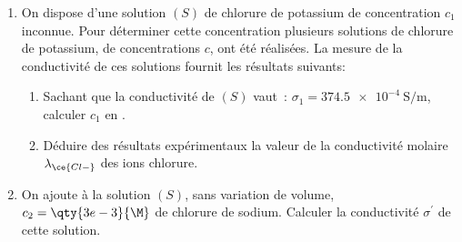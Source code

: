 \begin{enumerate}
    \item On dispose d'une solution $(S)$ de chlorure de potassium  de
          concentration $c_1$ inconnue. Pour déterminer cette concentration
          plusieurs solutions de chlorure de potassium, de concentrations $c$,
          ont été réalisées. La mesure de la conductivité de ces solutions
          fournit les résultats suivants:

          \begin{figure}[H]
              \centering
          \end{figure}
          \begin{enumerate}
              \item Sachant que la conductivité de $(S)$ vaut~:
                    $\sigma_1=\qty{374,5e-4}{\siemens\per\meter}$, calculer
                    $c_1$ en \unit{\M}.
              \item Déduire des résultats expérimentaux la valeur de la
                    conductivité molaire $\lambda_{\ce{Cl-}}$ des ions chlorure.
          \end{enumerate}
    \item On ajoute à la solution $(S)$, sans variation de volume,
          $c_2=\qty{3e-3}{\M}$ de chlorure de sodium. Calculer la conductivité
          $\sigma^{\prime}$ de cette solution.
\end{enumerate}
    

